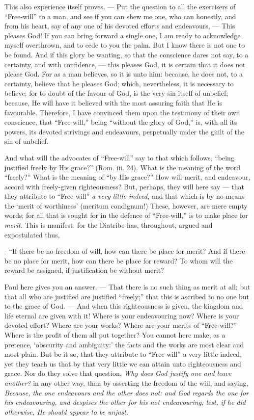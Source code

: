 This also experience itself proves. — Put the question to all the exercisers of “Free-will” to a man, and see if you can shew me one, who can honestly, and from his heart, say of any one of his devoted efforts and endeavours, — This pleases God! If you can bring forward a single one, I am ready to acknowledge myself overthrown, and to cede to you the palm. But I know there is not one to be found. And if this glory be wanting, so that the conscience dares not say, to a certainty, and with confidence, — this pleases God, it is certain that it does not please God. For as a man believes, so it is unto him: because, he does not, to a certainty, believe that he pleases God; which, nevertheless, it is necessary to believe; for to doubt of the favour of God, is the very sin itself of unbelief; because, He will have it believed with the most assuring faith that He is favourable. Therefore, I have convinced them upon the testimony of their own conscience, that “Free-will,” being “without the glory of God,” is, with all its powers, its devoted strivings and endeavours, perpetually under the guilt of the sin of unbelief.

And what will the advocates of “Free-will” say to that which follows, “being justified freely by His grace?” (Rom. iii. 24). What is the meaning of the word “freely?” What is the meaning of “by His grace?” How will merit, and endeavour, accord with freely-given righteousness? But, perhaps, they will here say — that they attribute to “Free-will” \emph{a very little indeed, }and that which is by no means the ‘merit of worthiness’ (meritum condignum!) These, however, are mere empty words: for all that is sought for in the defence of “Free-will,” is to make place for \emph{merit. }This is manifest: for the Diatribe has, throughout, argued and expostulated thus,

- “If there be no freedom of will, how can there be place for merit? And if there be no place for merit, how can there be place for reward? To whom will the reward be assigned, if justification be without merit?

Paul here gives you an answer. — That there is no such thing as merit at all; but that all who are justified are justified “freely;” that this is ascribed to no one but to the grace of God. — And when this righteousness is given, the kingdom and life eternal are given with it! Where is your endeavouring now? Where is your devoted effort? Where are your works? Where are your merits of “Free-will?” Where is the profit of them all put together? You cannot here make, as a pretence, ‘obscurity and ambiguity:’ the facts and the works are most clear and most plain. But be it so, that they attribute to “Free-will” a very little indeed, yet they teach us that by that very little we can attain unto righteousness and grace. Nor do they solve that question, \emph{Why does God justify one and leave another?} in any other way, than by asserting the freedom of the will, and saying, \emph{Because, the one endeavours and the other does not: and God regards the one for his endeavouring, and despises the other for his not endeavouring; lest, if he did otherwise, He should appear to be unjust.}

